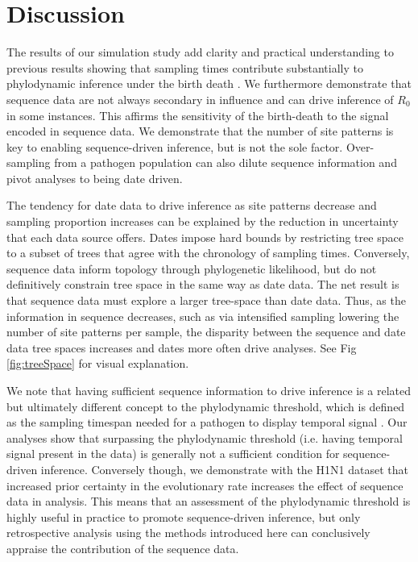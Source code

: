 \documentclass{article}
\begin{document}
\section*{Discussion}
The results of our simulation study add clarity and practical understanding to previous results showing that sampling times contribute substantially to phylodynamic inference under the birth death \citep{volz_sampling_2014, Featherstone2021Infectious}. We furthermore demonstrate that sequence data are not always secondary in influence and can drive inference of $R_{0}$ in some instances. This affirms the sensitivity of the birth-death to the signal encoded in sequence data. We demonstrate that the number of site patterns is key to enabling sequence-driven inference, but is not the sole factor. Over-sampling from a pathogen population can also dilute sequence information and pivot analyses to being date driven.

The tendency for date data to drive inference as site patterns decrease and sampling proportion increases can be explained by the reduction in uncertainty that each data source offers. Dates impose hard bounds by restricting tree space to a subset of trees that agree with the chronology of sampling times. Conversely, sequence data inform topology through phylogenetic likelihood, but do not definitively constrain tree space in the same way as date data. The net result is that sequence data must explore a larger tree-space than date data. Thus, as the information in sequence decreases, such as via intensified sampling lowering the number of site patterns per sample, the disparity between the sequence and date data tree spaces increases and dates more often drive analyses. See Fig \ref{fig:treeSpace} for visual explanation.

We note that having sufficient sequence information to drive inference is a related but ultimately different concept to the phylodynamic threshold, which is defined as the sampling timespan needed for a pathogen to display temporal signal \citep{duchene_temporal_2020}. Our analyses show that surpassing the phylodynamic threshold (i.e. having temporal signal present in the data) is generally not a sufficient condition for sequence-driven inference. Conversely though, we demonstrate with the H1N1 dataset that increased prior certainty in the evolutionary rate increases the effect of sequence data in analysis. This means that an assessment of the phylodynamic threshold is highly useful in practice to promote sequence-driven inference, but only retrospective analysis using the methods introduced here can conclusively appraise the contribution of the sequence data.
\end{document}
